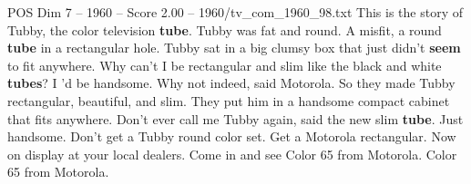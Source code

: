 \begin{textsample}{POS Dim 7 – 1960 – Score 2.00 – 1960/tv\_com\_1960\_98.txt}  \label{ex:f7_pos_029}
This is the story of Tubby, the color television \textbf{tube}.
Tubby was fat and round.
A misfit, a round \textbf{tube} in a rectangular hole.
Tubby sat in a big clumsy box that just didn't \textbf{seem} to fit anywhere.
Why can't I be rectangular and slim like the black and white \textbf{tubes}?
I 'd be handsome.
Why not indeed, said Motorola.
So they made Tubby rectangular, beautiful, and slim.
They put him in a handsome compact cabinet that fits anywhere.
Don't ever call me Tubby again, said the new slim \textbf{tube}.
Just handsome.
Don't get a Tubby round color set.
Get a Motorola rectangular.
Now on display at your local dealers.
Come in and see Color 65 from Motorola.
Color 65 from Motorola.

\end{textsample}
